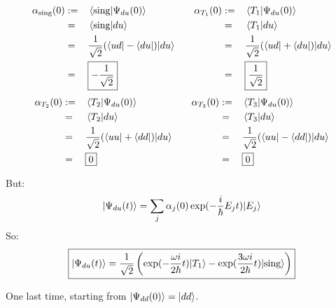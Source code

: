\documentclass[solutions.tex]{subfiles}
\begin{document}
\begin{equation*}\begin{aligned}
	\alpha_{\text{sing}}(0) &:=&& \left\langle \text{sing} \middle| \Psi_{du}(0) \right\rangle &&&
	\alpha_{T_1}(0) &:=&& \left\langle T_1 \middle| \Psi_{du}(0) \right\rangle \\
	~ &=&& \left\langle \text{sing} \middle| du \right\rangle &&&
	~ &=&& \left\langle T_1 \middle| du \right\rangle \\
	~ &=&& \frac1{\sqrt2}(\langle ud|-\langle du|)|du\rangle &&&
	~ &=&& \frac1{\sqrt2}(\langle ud|+\langle du|)|du\rangle \\
	~ &=&& \boxed{-\frac1{\sqrt2}} &&&
	~ &=&& \boxed{\frac1{\sqrt2}} \\
\end{aligned}\end{equation*}
\begin{equation*}\begin{aligned}
	\alpha_{T_2}(0) &:=&& \left\langle T_2 \middle| \Psi_{du}(0) \right\rangle &&&
	\alpha_{T_3}(0) &:=&& \left\langle T_3 \middle| \Psi_{du}(0) \right\rangle \\
	~ &=&& \left\langle T_2 \middle| du \right\rangle &&&
	~ &=&& \left\langle T_3 \middle| du \right\rangle \\
	~ &=&& \frac1{\sqrt2}(\langle uu|+\langle dd|)|du\rangle &&&
	~ &=&& \frac1{\sqrt2}(\langle uu|-\langle dd|)|du\rangle \\
	~ &=&& \boxed{0} &&&
	~ &=&& \boxed{0} \\
\end{aligned}\end{equation*}

But:
\[
	|\Psi_{du}(t)\rangle = \sum_j\alpha_j(0)\exp(-\frac{i}\hbar E_jt)|E_j\rangle
\]
So:
\[
	\boxed{
		|\Psi_{du}(t)\rangle = \frac1{\sqrt2}\left(
			\exp(-\frac{\omega i}{2\hbar} t)|T_1\rangle
			-\exp(\frac{3\omega i}{2\hbar} t)|\text{sing}\rangle
		\right)
	}
\]

\hr

One last time, starting from $|\Psi_{dd}(0)\rangle = |dd\rangle$.
\end{document}
